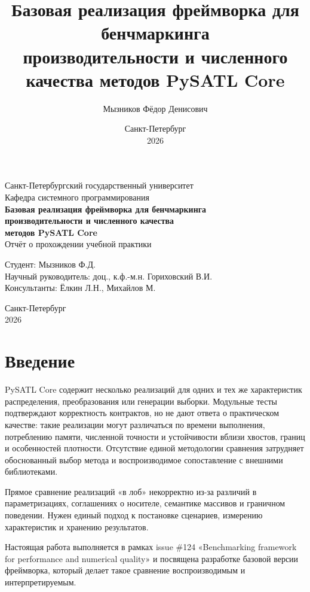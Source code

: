 \documentclass[12pt,a4paper]{article}
\title{Базовая реализация фреймворка для бенчмаркинга\\
производительности и численного качества методов PySATL Core}
\author{Мызников Фёдор Денисович}
\date{Санкт-Петербург\\2026}
\begin{document}
\begin{titlepage}
\centering
{\small Санкт-Петербургский государственный университет \\
Кафедра системного программирования}\\[1.5cm]

{\large \textbf{Базовая реализация фреймворка для бенчмаркинга \\
производительности и численного качества \\
методов PySATL Core}}\\[0.8cm]

{\normalsize Отчёт о прохождении учебной практики}\\[1.5cm]

\begin{flushleft}
Студент: \hfill Мызников Ф.Д. \\
Научный руководитель: \hfill доц., к.ф.-м.н. Гориховский В.И. \\
Консультанты: \hfill Ёлкин Л.Н., Михайлов М.
\end{flushleft}

\vfill
{\normalsize Санкт-Петербург\\2026}
\end{titlepage}
\newpage

{}
\tableofcontents
\newpage

\section{Введение}
\label{sec:intro}
PySATL Core содержит несколько реализаций для одних и тех же
характеристик распределения, преобразования или генерации выборки.
Модульные тесты подтверждают корректность контрактов, но не дают ответа
о практическом качестве: такие реализации могут различаться по времени
выполнения, потреблению памяти, численной точности и устойчивости
вблизи хвостов, границ и особенностей плотности. Отсутствие единой
методологии сравнения затрудняет обоснованный выбор метода и
воспроизводимое сопоставление с внешними библиотеками.

Прямое сравнение реализаций «в лоб» некорректно из-за различий
в параметризациях, соглашениях о носителе, семантике массивов
и граничном поведении. Нужен единый подход к постановке сценариев,
измерению характеристик и хранению результатов.

Настоящая работа выполняется в рамках issue \#124 «Benchmarking
framework for performance and numerical quality» \cite{issue_benchmark}
и посвящена разработке базовой версии фреймворка, который делает
такое сравнение воспроизводимым и интерпретируемым.
\newpage
\end{document}
